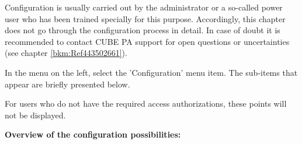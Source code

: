 Configuration is usually carried out by the administrator or a so-called power user who has been trained specially for this purpose. Accordingly, this chapter does not go through the configuration process in detail. In case of doubt it is recommended to contact CUBE PA support for open questions or uncertainties (see chapter \ref{bkm:Ref443502661}).

\vspace{\baselineskip}

In the menu on the left, select the 'Configuration' menu item. The sub-items that appear are briefly presented below.

\vspace{1.5cm} 

For users who do not have the required access authorizations, these points will not be displayed.\\

\vspace{3.5cm}  

\textbf{Overview of the configuration possibilities:}

\vspace{\baselineskip}

